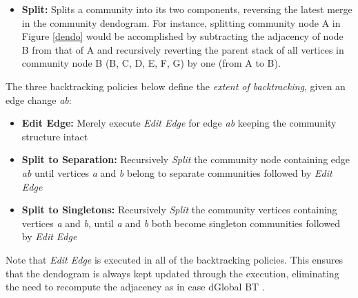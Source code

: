 \documentclass[conference]{IEEEtran}
\begin{document}
\begin{itemize}
\item \textbf{Split:} Splits a community into its two components, 
reversing the latest merge in the community dendogram. For instance, splitting 
community node A in Figure \ref{dendo} would be accomplished by subtracting the 
adjacency of node B from that of A and recursively reverting the parent stack 
of all vertices in community node B (B, C, D, E, F, G) by one (from A to B).
\end{itemize}
The three backtracking policies below define the \emph{extent of backtracking}, 
given an edge change \emph{ab}:
\begin{itemize}
 \item \textbf{Edit Edge:} Merely execute \emph{Edit Edge} for edge 
\emph{ab} keeping the community structure intact
 \item \textbf{Split to Separation:} Recursively \emph{Split} the community 
node containing edge \emph{ab} until vertices \emph{a} and \emph{b} belong to 
separate communities followed by \emph{Edit Edge}
 \item \textbf{Split to Singletons:} Recursively \emph{Split} the 
community 
vertices containing vertices \emph{a} and \emph{b}, until \emph{a} and \emph{b} 
both become singleton communities followed by \emph{Edit Edge}
\end{itemize}
Note that \emph{Edit Edge} is executed in all of the backtracking policies. 
This ensures that the dendogram is always kept updated through the 
execution, eliminating the need to recompute the adjacency as in case dGlobal 
BT \cite{gor}.
\vspace{0.2cm}
\end{document}

